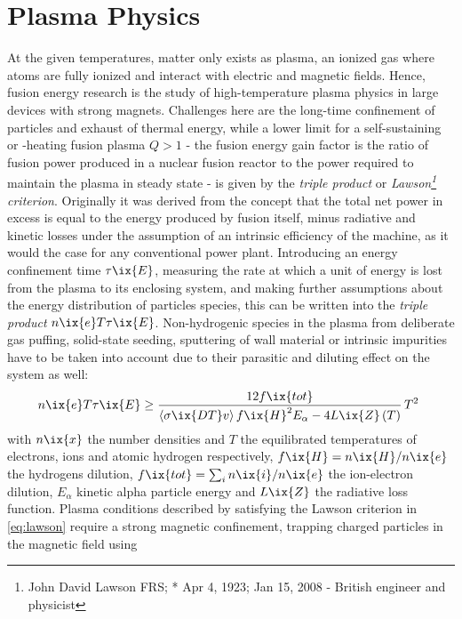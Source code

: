     \section{Plasma Physics}\label{sec:plasmaphysics}%
%
        At the given temperatures, matter only exists as plasma, an ionized gas where atoms are fully ionized and interact with electric and magnetic fields. Hence, fusion energy research is the study of high-temperature plasma physics in large devices with strong magnets. Challenges here are the long-time confinement of particles and exhaust of thermal energy, while a lower limit for a self-sustaining or -heating fusion plasma $Q>1$ - the fusion energy gain factor is the ratio of fusion power produced in a nuclear fusion reactor to the power required to maintain the plasma in steady state - is given by the \textit{triple product} or \textit{Lawson\footnote[1]{John David Lawson FRS; * Apr 4, 1923; \textdagger Jan 15, 2008 - British engineer and physicist} criterion}. Originally it was derived from the concept that the total net power in excess is equal to the energy produced by fusion itself, minus radiative and kinetic losses under the  assumption of an intrinsic efficiency of the machine, as it would the case for any conventional power plant. Introducing an energy confinement time $\tau\ix{E}$, measuring the rate at which a unit of energy is lost from the plasma to its enclosing system, and making further assumptions about the energy distribution of particles species, this can be written into the \textit{triple product} $n\ix{e}T\tau\ix{E}$. Non-hydrogenic species in the plasma from deliberate gas puffing, solid-state seeding, sputtering of wall material or intrinsic impurities have to be taken into account due to their parasitic and diluting effect on the system as well:%
%
        \begin{align}%
            n\ix{e}T\tau\ix{E}\ge\frac{12f\ix{tot}}{\left\langle\sigma\ix{DT}v\right\rangle f\ix{H}^{2}E_{\alpha}-4L\ix{Z}\left(T\right)}\,T^{2}\,\,\label{eq:lawson}%
        \end{align}%
%
        with $n\ix{x}$ the number densities and $T$ the equilibrated temperatures of electrons, ions and atomic hydrogen respectively, $f\ix{H}=n\ix{H}/n\ix{e}$ the hydrogens dilution, $f\ix{tot}=\sum_{i}n\ix{i}/n\ix{e}$ the ion-electron dilution, $E_{\alpha}$ kinetic alpha particle energy and $L\ix{Z}$ the radiative loss function. Plasma conditions described by satisfying the Lawson criterion in \cref{eq:lawson} require a strong magnetic confinement, trapping charged particles in the magnetic field using
